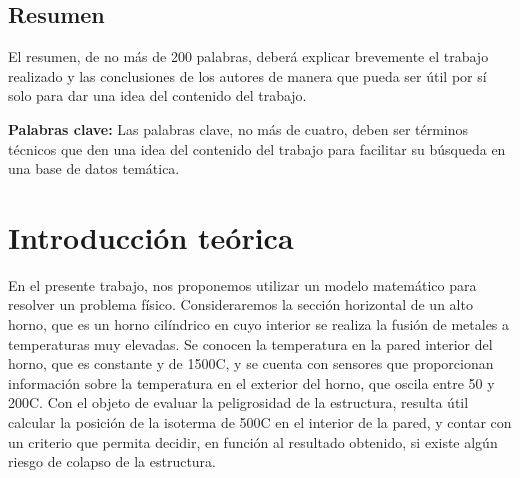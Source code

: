\documentclass[11pt, a4paper, spanish]{article}
\let\strong\textbf
\theoremstyle{plain}
\theoremstyle{remark}
\begin{document}


\maketitle
\newpage

\begin{addmargin}[4em]{4em}

\section*{\centering Resumen}
  El resumen, de no más de 200 palabras, deberá explicar brevemente el trabajo realizado y las conclusiones de los autores de manera que pueda ser útil por sí solo para dar una idea del contenido del trabajo.

\vspace{4em}
\noindent \strong{Palabras clave:} Las palabras clave, no más de cuatro, deben ser términos técnicos que den una idea del contenido del trabajo para facilitar su búsqueda en una base de datos temática.

\end{addmargin}
\newpage

\tableofcontents
\newpage

\section{Introducción teórica}

  En el presente trabajo, nos proponemos utilizar un modelo matemático para resolver un problema físico. Consideraremos la sección horizontal de un alto horno, que es un horno cilíndrico en cuyo interior se realiza la fusión de metales a temperaturas muy elevadas. Se conocen la temperatura en la pared interior del horno, que es constante y de 1500{\degree}C, y se cuenta con sensores que proporcionan información sobre la temperatura en el exterior del horno, que oscila entre 50 y 200{\degree}C. Con el objeto de evaluar la peligrosidad de la estructura, resulta útil calcular la posición de la isoterma de 500{\degree}C en el interior de la pared, y contar con un criterio que permita decidir, en función al resultado obtenido, si existe algún riesgo de colapso de la estructura.
\end{document}
